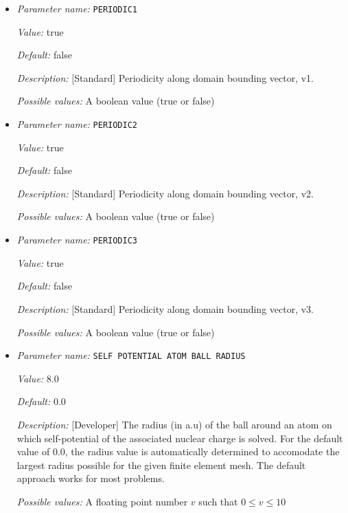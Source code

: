 \begin{itemize}
\item {\it Parameter name:} {\tt PERIODIC1}
\label{parameters:Boundary conditions/PERIODIC1}
\label{parameters:Boundary_20conditions/PERIODIC1}


{\it Value:} true


{\it Default:} false


{\it Description:} [Standard] Periodicity along domain bounding vector, v1.


{\it Possible values:} A boolean value (true or false)
\item {\it Parameter name:} {\tt PERIODIC2}
\label{parameters:Boundary conditions/PERIODIC2}
\label{parameters:Boundary_20conditions/PERIODIC2}


{\it Value:} true


{\it Default:} false


{\it Description:} [Standard] Periodicity along domain bounding vector, v2.


{\it Possible values:} A boolean value (true or false)
\item {\it Parameter name:} {\tt PERIODIC3}
\label{parameters:Boundary conditions/PERIODIC3}
\label{parameters:Boundary_20conditions/PERIODIC3}


{\it Value:} true


{\it Default:} false


{\it Description:} [Standard] Periodicity along domain bounding vector, v3.


{\it Possible values:} A boolean value (true or false)
\item {\it Parameter name:} {\tt SELF POTENTIAL ATOM BALL RADIUS}
\label{parameters:Boundary conditions/SELF POTENTIAL ATOM BALL RADIUS}
\label{parameters:Boundary_20conditions/SELF_20POTENTIAL_20ATOM_20BALL_20RADIUS}


{\it Value:} 8.0


{\it Default:} 0.0


{\it Description:} [Developer] The radius (in a.u) of the ball around an atom on which self-potential of the associated nuclear charge is solved. For the default value of 0.0, the radius value is automatically determined to accomodate the largest radius possible for the given finite element mesh. The default approach works for most problems.


{\it Possible values:} A floating point number $v$ such that $0 \leq v \leq 10$
\end{itemize}

